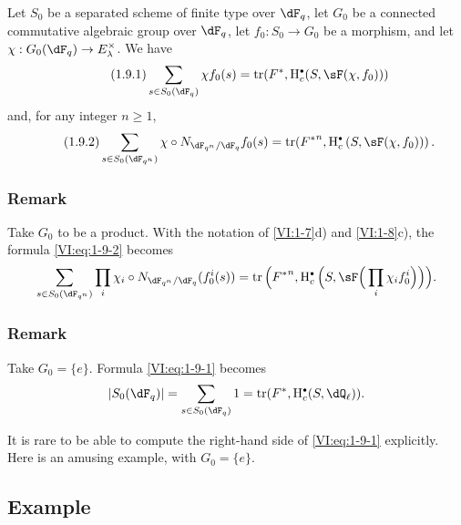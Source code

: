 \begin{theorem_}\label{VI:1-9}
Let $S_0$ be a separated scheme of finite type over $\dF_q$, let $G_0$ be a 
connected commutative algebraic group over $\dF_q$, let $f_0:S_0\to G_0$ be a morphism, and let 
$\chi:G_0(\dF_q) \to E_\lambda^\times$. We have 
\begin{equation*}\tag{1.9.1}\label{VI:eq:1-9-1}
  \sum_{s\in S_0(\dF_q)} \chi f_0(s) = \tr(F^\ast,\h_c^\bullet(S,\sF(\chi,f_0))) 
\end{equation*}
and, for any integer $n\geqslant 1$,
\begin{equation*}\tag{1.9.2}\label{VI:eq:1-9-2}
  \sum_{s\in S_0(\dF_{q^n})} \chi\circ N_{\dF_{q^n}/\dF_q} f_0(s) = \tr({F^\ast}^n, \h_c^\bullet\left(S,\sF(\chi,f_0))\right) \text{.}
\end{equation*}
\end{theorem_}





\addtocounter{subsubsection}{2}
\subsubsection{Remark}\label{VI:1-9-3}

Take $G_0$ to be a product. With the notation of \ref{VI:1-7}d) and 
\ref{VI:1-8}c), the formula \eqref{VI:eq:1-9-2} becomes 
\[
  \sum_{s\in S_0(\dF_{q^n})} \prod_i \chi_i\circ N_{\dF_{q^n}/\dF_q} (f_0^i(s)) = \tr\Big({F^\ast}^n, \h_c^\bullet\Big(S,\sF\Big(\prod_i \chi_i f_0^i\Big)\Big)\Big) \text{.}
\]





\subsubsection{Remark}\label{VI:1-9-4}

Take $G_0=\{e\}$. Formula \eqref{VI:eq:1-9-1} becomes 
\[
  \left|S_0(\dF_q)\right| = \sum_{s\in S_0(\dF_q)} 1 = \tr(F^\ast,\h_c^\bullet(S,\dQ_\ell)) \text{.}
\]

It is rare to be able to compute the right-hand side of 
\eqref{VI:eq:1-9-1} explicitly. Here is an amusing example, with $G_0=\{e\}$. 





\subsection{Example}\label{VI:1-10}

